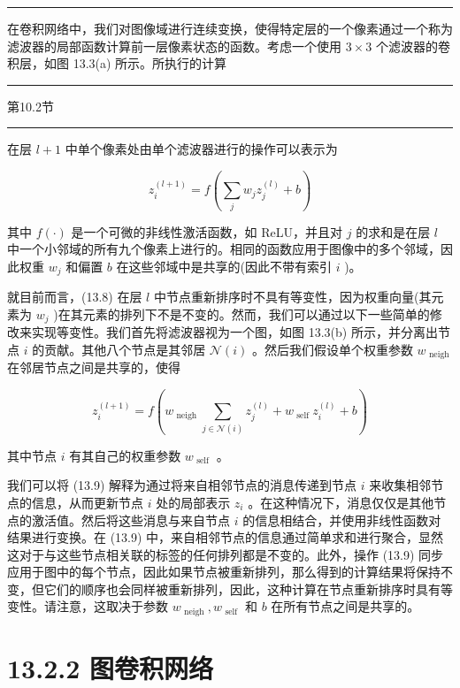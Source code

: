 \documentclass[10pt]{report}
\newcommand{\HRule}{\begin{center}\rule{0.9\linewidth}{0.2mm}\end{center}}
\begin{document}
\HRule

在卷积网络中，我们对图像域进行连续变换，使得特定层的一个像素通过一个称为滤波器的局部函数计算前一层像素状态的函数。考虑一个使用 \(3 \times  3\) 个滤波器的卷积层，如图 13.3(a) 所示。所执行的计算

\HRule

第10.2节

\HRule

在层 \(l + 1\) 中单个像素处由单个滤波器进行的操作可以表示为

\[
{z}_{i}^{\left( l + 1\right) } = f\left( {\mathop{\sum }\limits_{j}{w}_{j}{z}_{j}^{\left( l\right) } + b}\right)  \tag{13.8}
\]

其中 \(f\left( \cdot \right)\) 是一个可微的非线性激活函数，如 ReLU，并且对 \(j\) 的求和是在层 \(l\) 中一个小邻域的所有九个像素上进行的。相同的函数应用于图像中的多个邻域，因此权重 \({w}_{j}\) 和偏置 \(b\) 在这些邻域中是共享的(因此不带有索引 \(i\) )。

就目前而言，(13.8) 在层 \(l\) 中节点重新排序时不具有等变性，因为权重向量(其元素为 \({w}_{j}\) )在其元素的排列下不是不变的。然而，我们可以通过以下一些简单的修改来实现等变性。我们首先将滤波器视为一个图，如图 13.3(b) 所示，并分离出节点 \(i\) 的贡献。其他八个节点是其邻居 \(\mathcal{N}\left( i\right)\) 。然后我们假设单个权重参数 \({w}_{\text{ neigh }}\) 在邻居节点之间是共享的，使得

\[
{z}_{i}^{\left( l + 1\right) } = f\left( {{w}_{\text{ neigh }}\mathop{\sum }\limits_{{j \in  \mathcal{N}\left( i\right) }}{z}_{j}^{\left( l\right) } + {w}_{\text{ self }}{z}_{i}^{\left( l\right) } + b}\right)  \tag{13.9}
\]

其中节点 \(i\) 有其自己的权重参数 \({w}_{\text{ self }}\) 。

我们可以将 (13.9) 解释为通过将来自相邻节点的消息传递到节点 \(i\) 来收集相邻节点的信息，从而更新节点 \(i\) 处的局部表示 \({z}_{i}\) 。在这种情况下，消息仅仅是其他节点的激活值。然后将这些消息与来自节点 \(i\) 的信息相结合，并使用非线性函数对结果进行变换。在 (13.9) 中，来自相邻节点的信息通过简单求和进行聚合，显然这对于与这些节点相关联的标签的任何排列都是不变的。此外，操作 (13.9) 同步应用于图中的每个节点，因此如果节点被重新排列，那么得到的计算结果将保持不变，但它们的顺序也会同样被重新排列，因此，这种计算在节点重新排序时具有等变性。请注意，这取决于参数 \({w}_{\text{ neigh }},{w}_{\text{ self }}\) 和 \(b\) 在所有节点之间是共享的。

\section*{13.2.2 图卷积网络}
\end{document}
